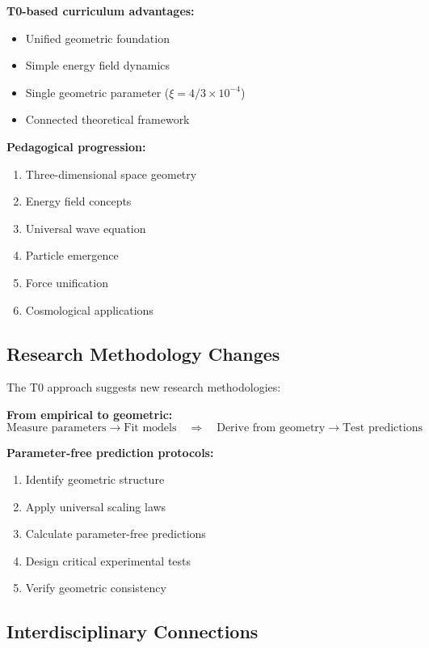 \documentclass[12pt,a4paper]{report}
\begin{document}
\textbf{T0-based curriculum advantages:}
\begin{itemize}
	\item Unified geometric foundation
	\item Simple energy field dynamics
	\item Single geometric parameter ($\xi = 4/3 \times 10^{-4}$)
	\item Connected theoretical framework
\end{itemize}

\textbf{Pedagogical progression:}
\begin{enumerate}
	\item Three-dimensional space geometry
	\item Energy field concepts
	\item Universal wave equation
	\item Particle emergence
	\item Force unification
	\item Cosmological applications
\end{enumerate}

\subsection{Research Methodology Changes}
\label{subsec:research_methodology}

The T0 approach suggests new research methodologies:

\textbf{From empirical to geometric:}
\begin{equation}
	\text{Measure parameters} \rightarrow \text{Fit models} \quad \Rightarrow \quad \text{Derive from geometry} \rightarrow \text{Test predictions}
\end{equation}

\textbf{Parameter-free prediction protocols:}
\begin{enumerate}
	\item Identify geometric structure
	\item Apply universal scaling laws
	\item Calculate parameter-free predictions
	\item Design critical experimental tests
	\item Verify geometric consistency
\end{enumerate}

\subsection{Interdisciplinary Connections}
\label{subsec:interdisciplinary_connections}
\end{document}
